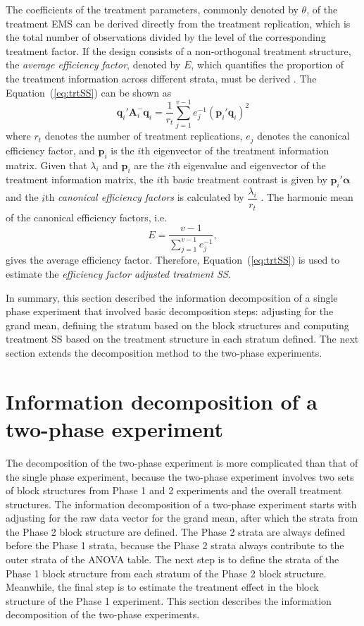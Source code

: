 \documentclass[article]{jss}
\newcommand{\A}{\mathbf{A}}
\begin{document}
The coefficients of the treatment parameters, commonly denoted by $\theta$, of the treatment EMS can be derived directly from the treatment replication, which is the total number of observations divided by the level of the corresponding treatment factor. If the design consists of a non-orthogonal treatment structure, the \emph{average efficiency factor}, denoted by $E$, which quantifies the proportion of the treatment information across different strata, must be derived \citep{Yates1936}. The Equation~(\ref{eq:trtSS}) can be shown as 
\begin{equation}\label{eq:projTrtBlock}
 \bm{q}_{i}' \A_{i}^{-} \bm{q}_{i} = \dfrac{1}{r_t} \sum^{v - 1}_{j = 1} e_j^{-1} (\bm{p}_i' \bm{q}_{i})^2
\end{equation}
where $r_t$ denotes the number of treatment replications, $e_j$ denotes the canonical efficiency factor, and $\bm{p}_i$ is the $i$th eigenvector of the treatment information matrix. Given that $\lambda_i$ and $\bm{p}_i$ are the $i$th eigenvalue and eigenvector of the treatment information matrix, the $i$th basic treatment contrast is given by $\bm{p}_i'\bm{\alpha}$ and the $i$th \emph{canonical efficiency factors} is calculated by $\dfrac{\lambda_i}{r_t}$ \citep{John1987}. The harmonic mean of the canonical efficiency factors, i.e.\
\[
E = \dfrac{v-1}{\sum^{v - 1}_{j = 1} e_j^{-1}},
\]
gives the average efficiency factor. Therefore, Equation~(\ref{eq:trtSS}) is used to estimate the \emph{efficiency factor adjusted treatment SS}.

In summary, this section described the information decomposition of a single phase experiment that involved basic decomposition steps: adjusting for the grand mean, defining the stratum based on the block structures and computing treatment SS based on the treatment structure in each stratum defined. The next section extends the decomposition method to the two-phase experiments.  

\section{Information decomposition of a two-phase experiment} 
\label{sec:infoiDecompTwoPase}
The decomposition of the two-phase experiment is more complicated than that of the single phase experiment, because the two-phase experiment involves two sets of block structures from Phase 1 and 2 experiments and the overall treatment structures. The information decomposition of a two-phase experiment starts with adjusting for the raw data vector for the grand mean, after which the strata from the Phase 2 block structure are defined. The Phase 2 strata are always defined before the Phase 1 strata, because the Phase 2 strata always contribute to the outer strata of the ANOVA table. The next step is to define the strata of the Phase 1 block structure from each stratum of the Phase 2 block structure. Meanwhile, the final step is to estimate the treatment effect in the block structure of the Phase 1 experiment. This section describes the information decomposition of the two-phase experiments.
\end{document}
